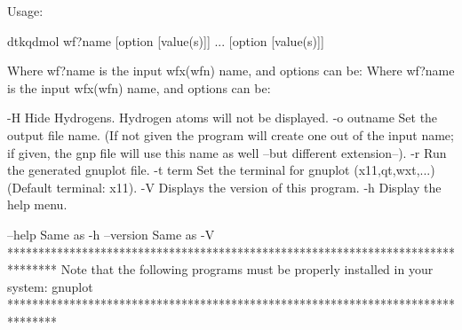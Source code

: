 

Usage:

	dtkqdmol wf?name [option [value(s)]] ... [option [value(s)]]

Where wf?name is the input wfx(wfn) name, and options can be:
Where wf?name is the input wfx(wfn) name, and options can be:

  -H        	Hide Hydrogens. Hydrogen atoms will not be displayed.
  -o outname	Set the output file name.
            	  (If not given the program will create one out of
            	  the input name; if given, the gnp file will
            	  use this name as well --but different extension--).
  -r        	Run the generated gnuplot file.
  -t term   	Set the terminal for gnuplot (x11,qt,wxt,...)
            	  (Default terminal: x11).
  -V        	Displays the version of this program.
  -h        	Display the help menu.

  --help    		Same as -h
  --version 		Same as -V
********************************************************************************
  Note that the following programs must be properly installed in your system:
                                    gnuplot
********************************************************************************

